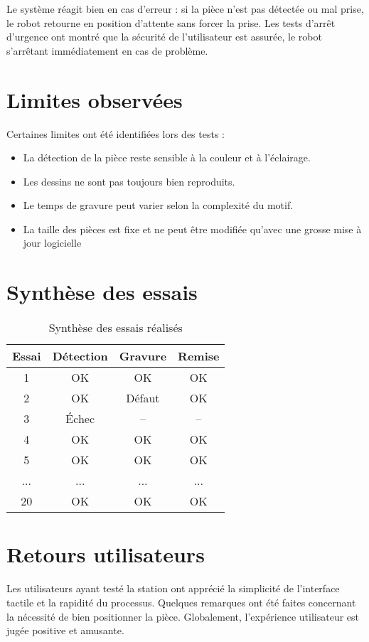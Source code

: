 Le système réagit bien en cas d'erreur : si la pièce n'est pas détectée ou mal prise, le robot retourne en position d'attente sans forcer la prise. Les tests d'arrêt d'urgence ont montré que la sécurité de l'utilisateur est assurée, le robot s'arrêtant immédiatement en cas de problème.

\section{Limites observées}

Certaines limites ont été identifiées lors des tests :
\begin{itemize}
    \item La détection de la pièce reste sensible à la couleur et à l'éclairage.
    \item Les dessins ne sont pas toujours bien reproduits.
    \item Le temps de gravure peut varier selon la complexité du motif.
    \item La taille des pièces est fixe et ne peut être modifiée qu'avec une grosse mise à jour logicielle
\end{itemize}

\section{Synthèse des essais}

\begin{table}[H]
    \centering
    \begin{tabular}{|c|c|c|c|}
        \hline
        Essai & Détection & Gravure & Remise \\
        \hline
        1 & OK & OK & OK \\
        2 & OK & Défaut & OK \\
        3 & Échec & -- & -- \\
        4 & OK & OK & OK \\
        5 & OK & OK & OK \\
        ... & ... & ... & ... \\
        20 & OK & OK & OK \\
        \hline
    \end{tabular}
    \caption{Synthèse des essais réalisés}
    \label{tab:synthese_essais}
\end{table}

\section{Retours utilisateurs}

Les utilisateurs ayant testé la station ont apprécié la simplicité de l'interface tactile et la rapidité du processus. Quelques remarques ont été faites concernant la nécessité de bien positionner la pièce. Globalement, l'expérience utilisateur est jugée positive et amusante.

